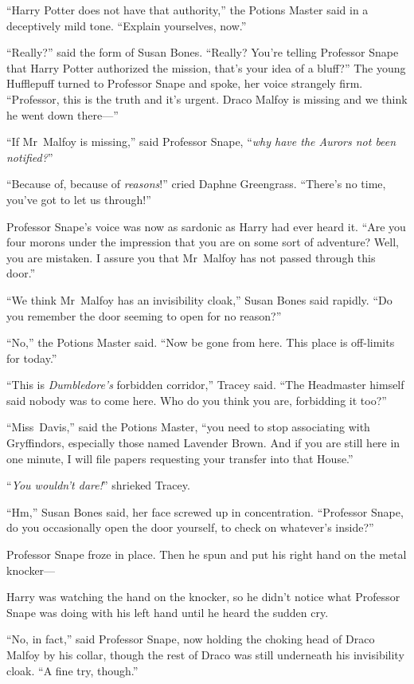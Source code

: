 “Harry Potter does not have that authority,” the Potions Master said in a deceptively mild tone.
“Explain yourselves, now.”

“Really?” said the form of Susan Bones.
“Really? You’re telling Professor Snape that Harry Potter authorized the mission, that’s your idea of a bluff?” The young Hufflepuff turned to Professor Snape and spoke, her voice strangely firm.
“Professor, this is the truth and it’s urgent. Draco Malfoy is missing and we think he went down there—”

“If Mr~Malfoy is missing,” said Professor Snape, “\emph{why have the Aurors not been notified?}”

“Because of, because of \emph{reasons}!” cried Daphne Greengrass.
“There’s no time, you’ve got to let us through!”

Professor Snape’s voice was now as sardonic as Harry had ever heard it.
“Are you four morons under the impression that you are on some sort of adventure? Well, you are mistaken. I assure you that Mr~Malfoy has not passed through this door.”

“We think Mr~Malfoy has an invisibility cloak,” Susan Bones said rapidly.
“Do you remember the door seeming to open for no reason?”

“No,” the Potions Master said.
“Now be gone from here. This place is off-limits for today.”

“This is \emph{Dumbledore’s} forbidden corridor,” Tracey said.
“The Headmaster himself said nobody was to come here. Who do you think you are, forbidding it too?”

“Miss~Davis,” said the Potions Master, “you need to stop associating with Gryffindors, especially those named Lavender Brown. And if you are still here in one minute, I will file papers requesting your transfer into that House.”

“\emph{You wouldn’t dare!}” shrieked Tracey.

“Hm,” Susan Bones said, her face screwed up in concentration.
“Professor Snape, do you occasionally open the door yourself, to check on whatever’s inside?”

Professor Snape froze in place. Then he spun and put his right hand on the metal knocker—

Harry was watching the hand on the knocker, so he didn’t notice what Professor Snape was doing with his left hand until he heard the sudden cry.

“No, in fact,” said Professor Snape, now holding the choking head of Draco Malfoy by his collar, though the rest of Draco was still underneath his invisibility cloak.
“A fine try, though.”

